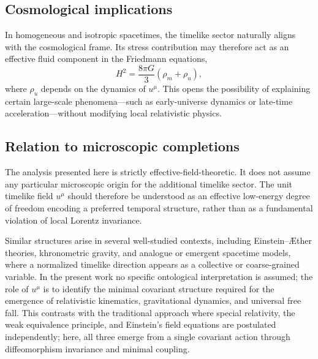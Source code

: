 \documentclass[11pt]{article}
\begin{document}
        \subsection{Cosmological implications}
            In homogeneous and isotropic spacetimes, the timelike sector naturally aligns
            with the cosmological frame.
            Its stress contribution may therefore act as an effective fluid component in
            the Friedmann equations,
            \begin{equation}
                H^2 = \frac{8\pi G}{3}\left(\rho_m + \rho_u\right),
            \end{equation}
            where $\rho_u$ depends on the dynamics of $u^\mu$.
            This opens the possibility of explaining certain large-scale phenomena—such as
            early-universe dynamics or late-time acceleration—without modifying local
            relativistic physics.

        \subsection{Relation to microscopic completions}
            The analysis presented here is strictly effective-field-theoretic.
            It does not assume any particular microscopic origin for the additional
            timelike sector.
            The unit timelike field $u^\mu$ should therefore be understood as an
            effective low-energy degree of freedom encoding a preferred temporal
            structure, rather than as a fundamental violation of local Lorentz
            invariance.

            Similar structures arise in several well-studied contexts, including
            Einstein--\AE ther theories, khronometric gravity, and analogue or emergent
            spacetime models, where a normalized timelike direction appears as a
            collective or coarse-grained variable.
            In the present work no specific ontological interpretation is assumed;
            the role of $u^\mu$ is to identify the minimal covariant structure required
            for the emergence of relativistic kinematics, gravitational dynamics, and
            universal free fall.
            This contrasts with the traditional approach where special relativity, the
            weak equivalence principle, and Einstein's field equations are postulated
            independently; here, all three emerge from a single covariant action through
            diffeomorphism invariance and minimal coupling.
\end{document}
